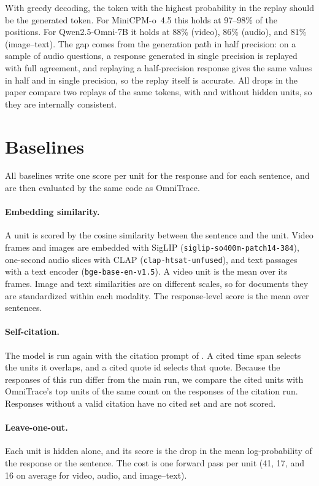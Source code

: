 With greedy decoding, the token with the highest probability in the replay should be the generated token.
For MiniCPM-o~4.5 this holds at 97--98\% of the positions. For Qwen2.5-Omni-7B it holds at 88\% (video), 86\% (audio), and 81\% (image--text).
The gap comes from the generation path in half precision: on a sample of audio questions, a response generated in single precision is replayed with full agreement, and replaying a half-precision response gives the same values in half and in single precision, so the replay itself is accurate.
All drops in the paper compare two replays of the same tokens, with and without hidden units, so they are internally consistent.

\section{Baselines}
\label{appendix:baselines}

All baselines write one score per unit for the response and for each sentence, and are then evaluated by the same code as OmniTrace.

\paragraph{Embedding similarity.}
A unit is scored by the cosine similarity between the sentence and the unit. Video frames and images are embedded with SigLIP (\texttt{siglip-so400m-patch14-384}), one-second audio slices with CLAP (\texttt{clap-htsat-unfused}), and text passages with a text encoder (\texttt{bge-base-en-v1.5}). A video unit is the mean over its frames. Image and text similarities are on different scales, so for documents they are standardized within each modality. The response-level score is the mean over sentences.

\paragraph{Self-citation.}
The model is run again with the citation prompt of . A cited time span selects the units it overlaps, and a cited quote id selects that quote. Because the responses of this run differ from the main run, we compare the cited units with OmniTrace's top units of the same count on the responses of the citation run. Responses without a valid citation have no cited set and are not scored.

\paragraph{Leave-one-out.}
Each unit is hidden alone, and its score is the drop in the mean log-probability of the response or the sentence. The cost is one forward pass per unit (41, 17, and 16 on average for video, audio, and image--text).

